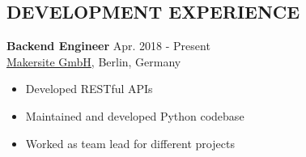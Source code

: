 \documentclass[margin, 10pt]{res} %
\begin{document}
\begin{resume}

 
% 





 
 
 
\section{DEVELOPMENT EXPERIENCE}
{\bf Backend Engineer} \hfill Apr. 2018 - Present \\
\href{https://www.makersite.de/}{Makersite GmbH}, Berlin, Germany
\begin{itemize} \itemsep -2pt
 \item Developed RESTful APIs
 \item Maintained and developed Python codebase
 \item Worked as team lead for different projects
\end{itemize}



\end{resume}
\end{document}
